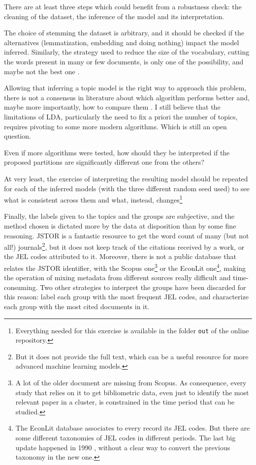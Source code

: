 \documentclass[a4paper, 11pt, headings=standardclasses, tablecaptionsbelow]{scrartcl}
\begin{document}
There are at least three steps which could benefit from a robustness check: the cleaning of the dataset, the inference of the model and its interpretation.

The choice of stemming the dataset is arbitrary, and it should be checked if the alternatives (lemmatization, embedding and doing nothing) impact the model inferred.
Similarly, the strategy used to reduce the size of the vocabulary, cutting the words present in many or few documents, is only one of the possibility, and maybe not the best one \parencite{gerlach2019}.

Allowing that inferring a topic model is the right way to approach this problem, there is not a consensus in literature about which algorithm performs better and, maybe more importantly, how to compare them \parencite[a recent and rare attempt is][]{shi2019}. I still believe that the limitations of LDA, particularly the need to fix a priori the number of topics, requires pivoting to some more modern algorithms. Which is still an open question.

Even if more algorithms were tested, how should they be interpreted if the proposed partitions are significantly different one from the others?

At very least, the exercise of interpreting the resulting model should be repeated for each of the inferred models (with the three different random seed used) to see what is consistent across them and what, instead, changes\footnote{Everything needed for this exercise is available in the folder \texttt{out} of the online repository.}

Finally, the labels given to the topics and the groups are subjective, and the method chosen is dictated more by the data at disposition than by some fine reasoning.
JSTOR is a fantastic resource to get the word count of many (but not all!) journals\footnote{But it does not provide the full text, which can be a useful resource for more advanced machine learning models.}, but it does not keep track of the citations received by a work, or the JEL codes attributed to it. Moreover, there is not a public database that relates the JSTOR identifier, with the Scopus one\footnote{A lot of the older document are missing from Scopus. As consequence, every study that relies on it to get bibliometric data, even just to identify the most relevant paper in a cluster, is constrained in the time period that can be studied.} or the EconLit one\footnote{The EconLit database associates to every record its JEL codes. But there are some different taxonomies of JEL codes in different periods. The last big update happened in 1990 \parencite{cherrier2017}, without a clear way to convert the previous taxonomy in the new one.}, making the operation of mixing metadata from different sources really difficult and time-consuming.
Two other strategies to interpret the groups have been discarded for this reason: label each group with the most frequent JEL codes, and characterize each group with the most cited documents in it.
\end{document}
